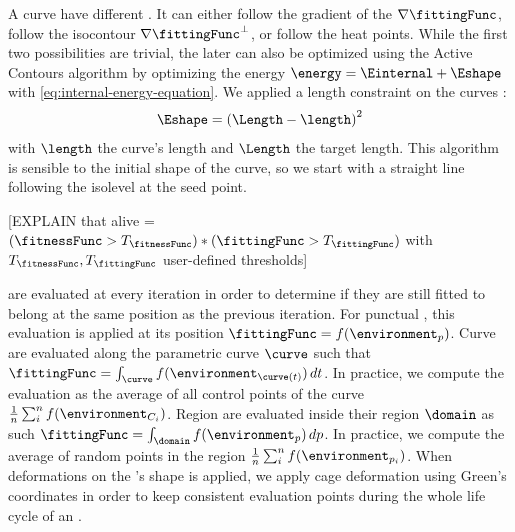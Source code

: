 A curve have different . It can either follow the gradient of the  $\nabla \fittingFunc$, follow the isocontour $\nabla \fittingFunc^\perp$, or follow the heat points.
While the first two possibilities are trivial, the later can also be optimized using the Active Contours algorithm by optimizing the energy $\energy = \Einternal + \Eshape$ with \eqref{eq:internal-energy-equation}. We applied a length constraint on the curves : 
\begin{align*}
    \Eshape = \left( \Length - \length \right)^2
\end{align*}
with $\length$ the curve's length and $\Length$ the target length. This algorithm is sensible to the initial shape of the curve, so we start with a straight line following the isolevel at the seed point.

[EXPLAIN that alive = $(\fitnessFunc > T_\fitnessFunc) * (\fittingFunc > T_\fittingFunc)$ with $T_\fitnessFunc, T_\fittingFunc$ user-defined thresholds]

 are evaluated at every iteration in order to determine if they are still fitted to belong at the same position as the previous iteration. For punctual , this evaluation is applied at its position $\fittingFunc = f(\environment_{p})$. Curve  are evaluated along the parametric curve $\curve$ such that $\fittingFunc = \int_{\curve} f(\environment_{\curve(t)}) \,dt$. In practice, we compute the evaluation as the average of all control points of the curve $\frac{1}{n} \sum_{i}^{n}{f(\environment_{C_i})}$.
Region  are evaluated inside their region $\domain$ as such $\fittingFunc = \int_{\domain} f(\environment_p) \,dp$. In practice, we compute the average of random points in the region $\frac{1}{n} \sum_{i}^{n}{f(\environment_{p_i})}$. When deformations on the 's shape is applied, we apply cage deformation using Green's coordinates in order to keep consistent evaluation points during the whole life cycle of an .



